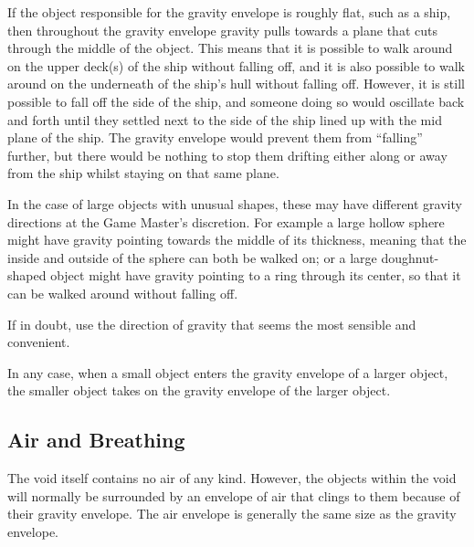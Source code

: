 \begin{multicols*}{2}
If the object responsible for the gravity envelope is roughly flat, such as a ship, then throughout the gravity envelope gravity pulls towards a plane that cuts through the middle of the object. This means that it is possible to walk around on the upper deck(s) of the ship without falling off, and it is also possible to walk around on the underneath of the ship’s hull without falling off. However, it is still possible to fall off the side of the ship, and someone doing so would oscillate back and forth until they settled next to the side of the ship lined up with the mid plane of the ship. The gravity envelope would prevent them from “falling” further, but there would be nothing to stop them drifting either along or away from the ship whilst staying on that same plane.

In the case of large objects with unusual shapes, these may have different gravity directions at the Game Master’s discretion. For example a large hollow sphere might have gravity pointing towards the middle of its thickness, meaning that the inside and outside of the sphere can both be walked on; or a large doughnut-shaped object might have gravity pointing to a ring through its center, so that it can be walked around without falling off.

If in doubt, use the direction of gravity that seems the most sensible and convenient.

In any case, when a small object enters the gravity envelope of a larger object, the smaller object takes on the gravity envelope of the larger object.


\subsection{Air and Breathing}
The void itself contains no air of any kind. However, the objects within the void will normally be surrounded by an envelope of air that clings to them because of their gravity envelope. The air envelope is generally the same size as the gravity envelope.


\end{multicols*}
